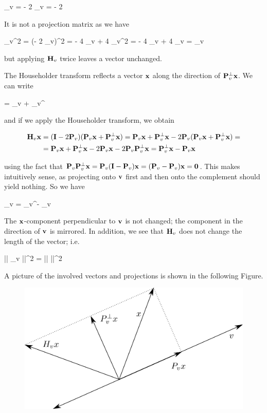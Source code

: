 \bee
\Hbf_v = \Ibf - 2 \Pbf_v = \Ibf - 2 
\eee

It is not a projection matrix as we have

\bee
\Hbf_v^2 = (\Ibf - 2 \Pbf_v)^2 = \Ibf - 4 \Pbf_v + 4 \Pbf_v^2 = \Ibf - 4 \Pbf_v + 4 \Pbf_v = \Ibf \neq \Hbf_v
\eee

but applying $\mathbf{H}_v$ twice leaves a vector unchanged.

The Householder transform reflects a vector $\mathbf{x}$ along the direction of $\mathbf{P}_v^\perp \mathbf{x}$. We can write

\bee
\xbf = \Pbf_v \xbf + \Pbf_v^\perp \xbf
\eee

and if we apply the Householder transform, we obtain

\begin{align*}
  \mathbf{H}_v \mathbf{x} &= (\mathbf{I} - 2 \mathbf{P}_v) (\mathbf{P}_v \mathbf{x} + \mathbf{P}_v^\perp \mathbf{x}) = \mathbf{P}_v \mathbf{x} + \mathbf{P}_v^\perp \mathbf{x} - 2 \mathbf{P}_v (\mathbf{P}_v \mathbf{x} + \mathbf{P}_v^\perp \mathbf{x}) = \\
  &= \mathbf{P}_v \mathbf{x} + \mathbf{P}_v^\perp \mathbf{x} - 2 \mathbf{P}_v \mathbf{x} - 2 \mathbf{P}_v \mathbf{P}_v^\perp \mathbf{x} = \mathbf{P}_v^\perp \mathbf{x} - \mathbf{P}_v \mathbf{x}
\end{align*}

using the fact that $\mathbf{P}_v \mathbf{P}_v^\perp \mathbf{x} = \mathbf{P}_v (\mathbf{I} - \mathbf{P}_v) \mathbf{x} = (\mathbf{P}_v - \mathbf{P}_v) \mathbf{x} = \mathbf{0}$. This makes intuitively sense, as projecting onto $\mathbf{v}$ first and then onto the complement should yield nothing. So we have

\bee
\Hbf_v \xbf = \Pbf_v^\perp \xbf - \Pbf_v \xbf
\eee

The $\mathbf{x}$-component perpendicular to $\mathbf{v}$ is not changed; the component in the direction of $\mathbf{v}$ is mirrored. In addition, we see that $\mathbf{H}_v$ does not change the length of the vector; i.e.

\bee
|| \Hbf_v \xbf ||^2 = || \xbf ||^2
\eee

A picture of the involved vectors and projections is shown in the following Figure.

\begin{figure}[hbt!]
\centering
\includegraphics[scale=0.85]{images/num_lin_alg_06_01.png}
\end{figure}

